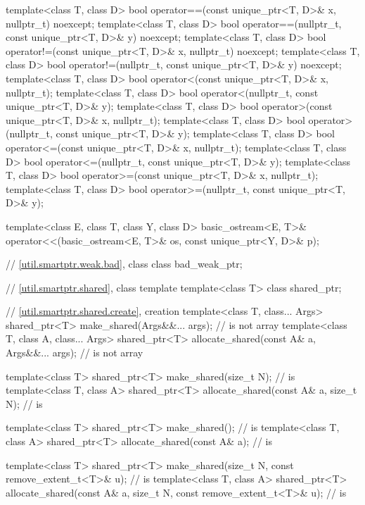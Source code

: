 \begin{codeblock}
{  template<class T, class D>
    bool operator==(const unique_ptr<T, D>& x, nullptr_t) noexcept;
  template<class T, class D>
    bool operator==(nullptr_t, const unique_ptr<T, D>& y) noexcept;
  template<class T, class D>
    bool operator!=(const unique_ptr<T, D>& x, nullptr_t) noexcept;
  template<class T, class D>
    bool operator!=(nullptr_t, const unique_ptr<T, D>& y) noexcept;
  template<class T, class D>
    bool operator<(const unique_ptr<T, D>& x, nullptr_t);
  template<class T, class D>
    bool operator<(nullptr_t, const unique_ptr<T, D>& y);
  template<class T, class D>
    bool operator>(const unique_ptr<T, D>& x, nullptr_t);
  template<class T, class D>
    bool operator>(nullptr_t, const unique_ptr<T, D>& y);
  template<class T, class D>
    bool operator<=(const unique_ptr<T, D>& x, nullptr_t);
  template<class T, class D>
    bool operator<=(nullptr_t, const unique_ptr<T, D>& y);
  template<class T, class D>
    bool operator>=(const unique_ptr<T, D>& x, nullptr_t);
  template<class T, class D>
    bool operator>=(nullptr_t, const unique_ptr<T, D>& y);

  template<class E, class T, class Y, class D>
    basic_ostream<E, T>& operator<<(basic_ostream<E, T>& os, const unique_ptr<Y, D>& p);

  // \ref{util.smartptr.weak.bad}, class 
  class bad_weak_ptr;

  // \ref{util.smartptr.shared}, class template 
  template<class T> class shared_ptr;

  // \ref{util.smartptr.shared.create},  creation
  template<class T, class... Args>
    shared_ptr<T> make_shared(Args&&... args);                                  //  is not array
  template<class T, class A, class... Args>
    shared_ptr<T> allocate_shared(const A& a, Args&&... args);                  //  is not array

  template<class T>
    shared_ptr<T> make_shared(size_t N);                                        //  is 
  template<class T, class A>
    shared_ptr<T> allocate_shared(const A& a, size_t N);                        //  is 

  template<class T>
    shared_ptr<T> make_shared();                                                //  is 
  template<class T, class A>
    shared_ptr<T> allocate_shared(const A& a);                                  //  is 

  template<class T>
    shared_ptr<T> make_shared(size_t N, const remove_extent_t<T>& u);           //  is 
  template<class T, class A>
    shared_ptr<T> allocate_shared(const A& a, size_t N,
                                  const remove_extent_t<T>& u);                 //  is 

}
\end{codeblock}
